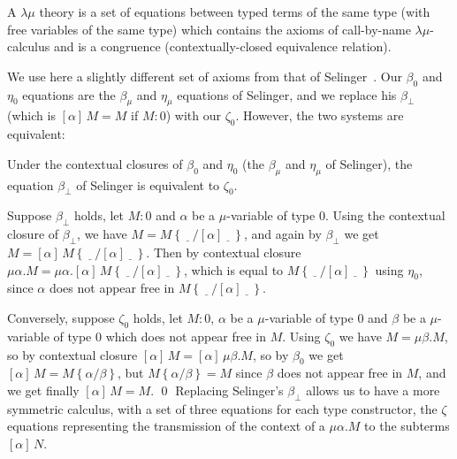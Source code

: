 \documentclass{CSML}
\newcommand*\LmSortBot0
\newcommand*\LmTerm[2]{#1\mathrel{:}#2}
\newcommand*\LmTermA{M}
\newcommand*\LmTermB{N}
\newcommand*\LmMVarA\alpha
\newcommand*\LmMVarB\beta
\newcommand*\LmSubst[1]{\left\{#1\right\}}
\begin{document}
\begin{defi}
A $\lambda\mu$ theory is a set of equations between typed terms of the same type (with free variables of the same type) which contains the axioms of call-by-name $\lambda\mu$-calculus and is a congruence (contextually-closed equivalence relation).
\end{defi}
We use here a slightly different set of axioms from that of Selinger~\cite{SelingerControl}. Our $\beta_0$ and $\eta_0$ equations are the $\beta_\mu$ and $\eta_\mu$ equations of Selinger, and we replace his $\beta_\bot$ (which is $\left[\LmMVarA\right]\,\LmTermA=\LmTermA$ if $\LmTerm{\LmTermA}{\LmSortBot}$) with our $\zeta_\LmSortBot$. However, the two systems are equivalent:
\begin{lem}
Under the contextual closures of $\beta_\LmSortBot$ and $\eta_\LmSortBot$ (the $\beta_\mu$ and $\eta_\mu$ of Selinger), the equation $\beta_\bot$ of Selinger is equivalent to $\zeta_\LmSortBot$.
\end{lem}
\proof
Suppose $\beta_\bot$ holds, let $\LmTerm{\LmTermA}{\LmSortBot}$ and $\LmMVarA$ be a $\mu$-variable of type $\LmSortBot$. Using the contextual closure of $\beta_\bot$, we have $\LmTermA=\LmTermA\LmSubst{\,\underline{\ \ }\,/\left[\LmMVarA\right]\,\underline{\ \ }\,}$, and again by $\beta_\bot$ we get $\LmTermA=\left[\LmMVarA\right]\,\LmTermA\LmSubst{\,\underline{\ \ }\,/\left[\LmMVarA\right]\,\underline{\ \ }\,}$. Then by contextual closure $\mu\LmMVarA.\LmTermA=\mu\LmMVarA.\left[\LmMVarA\right]\,\LmTermA\LmSubst{\,\underline{\ \ }\,/\left[\LmMVarA\right]\,\underline{\ \ }\,}$, which is equal to $\LmTermA\LmSubst{\,\underline{\ \ }\,/\left[\LmMVarA\right]\,\underline{\ \ }\,}$ using $\eta_\LmSortBot$, since $\LmMVarA$ does not appear free in $\LmTermA\LmSubst{\,\underline{\ \ }\,/\left[\LmMVarA\right]\,\underline{\ \ }\,}$.\par
Conversely, suppose $\zeta_\LmSortBot$ holds, let $\LmTerm{\LmTermA}{\LmSortBot}$, $\LmMVarA$ be a $\mu$-variable of type $\LmSortBot$ and $\beta$ be a $\mu$-variable of type $\LmSortBot$ which does not appear free in $\LmTermA$. Using $\zeta_\LmSortBot$ we have $\LmTermA=\mu\beta.\LmTermA$, so by contextual closure $\left[\LmMVarA\right]\,\LmTermA=\left[\LmMVarA\right]\,\mu\LmMVarB.\LmTermA$, so by $\beta_\LmSortBot$ we get $\left[\LmMVarA\right]\,\LmTermA=\LmTermA\LmSubst{\LmMVarA/\LmMVarB}$, but $\LmTermA\LmSubst{\LmMVarA/\LmMVarB}=\LmTermA$ since $\beta$ does not appear free in $\LmTermA$, and we get finally $\left[\LmMVarA\right]\,\LmTermA=\LmTermA$.
\qed
Replacing Selinger's $\beta_\bot$ allows us to have a more symmetric calculus, with a set of three equations for each type constructor, the $\zeta$ equations representing the transmission of the context of a $\mu\LmMVarA.\LmTermA$ to the subterms $\left[\LmMVarA\right]\,\LmTermB$.
\end{document}
